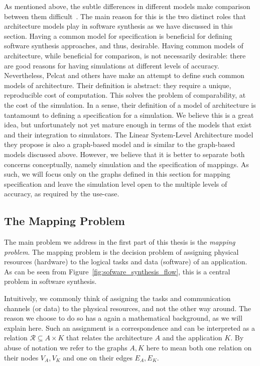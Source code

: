 As mentioned above, the subtle differences in different models make comparison between them difficult~\cite{goens_mcsoc16}.
The main reason for this is the two distinct roles that architecture models play in software synthesis as we have discussed in this section.
Having a common model for specification is beneficial for defining software synthesis approaches, and thus, desirable.
Having common models of architecture, while beneficial for comparison, is not necessarily desirable: there are good reasons for having simulations at different levels of accuracy.
Nevertheless, Pelcat and others have \cite{pelcat2015models} make an attempt to define such common models of architecture.
Their definition is abstract: they require a unique, reproducible cost of computation.
This solves the problem of comparability, at the cost of the simulation.
In a sense, their definition of a model of architecture is tantamount to defining a specification for a simulation.
We believe this is a great idea, but unfortunately not yet mature enough in terms of the models that exist and their integration to simulators.
The Linear System-Level Architecture model they propose is also a graph-based model and is similar to the graph-based models discussed above.
However, we believe that it is better to separate both concerns conceptually, namely simulation and the specification of mappings.
As such, we will focus only on the graphs defined in this section for mapping specification and leave the simulation level open to the multiple levels of accuracy, as required by the use-case.

\subsection{The Mapping Problem}

The main problem we address in the first part of this thesis is the \emph{mapping problem}\cite{marwedel2011mapping}.
The mapping problem is the decision problem of assigning physical resources (hardware) to the logical tasks and data (software) of an application.
As can be seen from Figure~\ref{fig:sofware_synthesis_flow}, this is a central problem in software synthesis.

Intuitively, we commonly think of assigning the tasks and communication channels (or data) to the physical resources, and not the other way around. 
The reason we choose to do so has a again a mathematical background, as we will explain here.
Such an assignment is a correspondence and can be interpreted as a relation $\mathcal{R} \subseteq A \times K$ that relates the architecture $A$ and the application $K$.
By abuse of notation we refer to the graphs $A,K$ here to mean both one relation on their nodes $V_A,V_K$ and one on their edges $E_A,E_K$.


